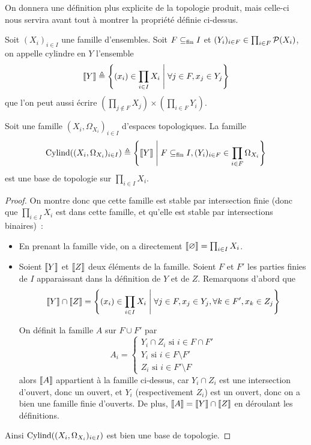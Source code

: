 On donnera une définition plus explicite de la topologie produit, mais celle-ci
nous servira avant tout à montrer la propriété définie ci-dessus.

\begin{definition}[Cylindre]
  Soit $(X_i)_{i\in I}$ une famille d'ensembles. Soit $F\subseteq_{\mathrm{fin}} I$ et
  $(Y_i)_{i\in F} \in \prod_{i \in F} \mathcal{P}(X_i)$, on appelle cylindre en $Y$
  l'ensemble
  \[\llbracket Y\rrbracket \triangleq \Bigg\{(x_i) \in \prod_{i \in I} X_i \;\Bigg|\;
  \forall j \in F, x_j \in Y_j\Bigg\}\]
  que l'on peut aussi écrire
  $\displaystyle\left(\prod_{j\notin F} X_j\right)\times
  \left(\prod_{i\in F} Y_i\right)$.
\end{definition}

\begin{property}
  Soit une famille $(X_i,\Omega_{X_i})_{i\in I}$ d'espaces topologiques. La
  famille
  \[\operatorname{Cylind}((X_i,\Omega_{X_i})_{i\in I})\triangleq\Bigg\{\llbracket Y\rrbracket \;\Bigg|\;
  F\subseteq_{\mathrm{fin}} I, (Y_i)_{i\in F}\in \prod_{i\in F}\Omega_{X_i}\Bigg\}\]
  est une base de topologie sur $\displaystyle\prod_{i \in I} X_i$.
\end{property}

\begin{proof}
  On montre donc que cette famille est stable par intersection finie (donc que
  $\prod_{i\in I} X_i$ est dans cette famille, et qu'elle est stable par
  intersections binaires)~:
  \begin{itemize}
  \item En prenant la famille vide, on a directement
    $\llbracket \varnothing\rrbracket = \prod_{i\in I} X_i$.
  \item Soient $\llbracket Y\rrbracket$ et $\llbracket Z\rrbracket$ deux éléments de la famille. Soient
    $F$ et $F'$ les parties finies de $I$ apparaissant dans la définition de
    $Y$ et de $Z$. Remarquons d'abord que
    \[\llbracket Y\rrbracket \cap \llbracket Z\rrbracket = \Bigg\{(x_i)\in \prod_{i \in I} X_i \;\Bigg|\;
    \forall j \in F, x_j \in Y_j, \forall k \in F', x_k \in Z_j\Bigg\}\]

    On définit la famille $A$ sur $F\cup F'$ par
    \[A_i =
    \begin{cases}
      Y_i\cap Z_i\text{ si } i\in F\cap F'\\
      Y_i\text{ si } i \in F \setminus F'\\
      Z_i\text{ si } i \in F'\setminus F
    \end{cases}\]
    alors $\llbracket A\rrbracket$ appartient à la famille ci-dessus, car $Y_i\cap Z_i$ est
    une intersection d'ouvert, donc un ouvert, et $Y_i$ (respectivement $Z_i$)
    est un ouvert, donc on a bien une famille finie d'ouverts. De plus,
    $\llbracket A\rrbracket = \llbracket Y\rrbracket \cap \llbracket Z\rrbracket$ en déroulant les définitions.
  \end{itemize}

  Ainsi $\operatorname{Cylind}((X_i,\Omega_{X_i})_{i\in I})$ est bien une base de topologie.
\end{proof}

